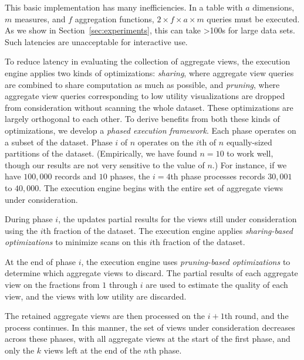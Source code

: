 This basic implementation has many inefficiencies.
In a table with $a$ dimensions, $m$ measures, and $f$ aggregation functions, 
$2\times f \times a \times  m$ queries must be executed.  
As we show in Section~\ref{sec:experiments}, this can take >100s for
 large data sets.
Such latencies are unacceptable for interactive use.

To reduce latency in 
evaluating the collection of aggregate views, 
the execution engine  
applies two kinds of optimizations:
{\em sharing}, where aggregate view queries are combined to share computation
as much as possible, and {\em pruning}, where aggregate view queries
corresponding to low utility visualizations are dropped from consideration without scanning the whole
dataset.
These optimizations are largely orthogonal to each other.
To derive benefits from both these kinds of optimizations,
we develop a {\em phased execution framework}.
Each phase operates on a subset of the dataset.
Phase $i$ of $n$ operates on the $i$th of $n$ equally-sized partitions of the dataset. 
(Empirically, we have found $n=10$ to
work well, though our results are not very sensitive to the value
of $n$.) 
For instance, if we have $100,000$ records and $10$ phases,
the $i = 4$th phase processes records $30,001$ to $40,000$.
The execution engine begins 
with the entire set of aggregate views under consideration.
\begin{denselist}
\item During phase $i$, the \SeeDB updates partial results
for the views
still under consideration using the $i$th fraction of the dataset.
The execution engine applies {\em sharing-based optimizations}
to minimize scans on this  $i$th fraction of the dataset.
\item At the end of phase $i$, the execution engine uses 
{\em pruning-based optimizations} to determine which aggregate views to discard.
The partial results of each aggregate view on the fractions from $1$ through $i$ are used to 
estimate the quality of each view, and the views with low utility are discarded. 
\end{denselist}
The retained aggregate views are then processed on the $i+1$th round,
and the process continues. 
In this manner, the set of views under consideration
decreases across these phases, with all aggregate views at the start 
of the first phase, and only the $k$ views left
at the end of the $n$th phase.

